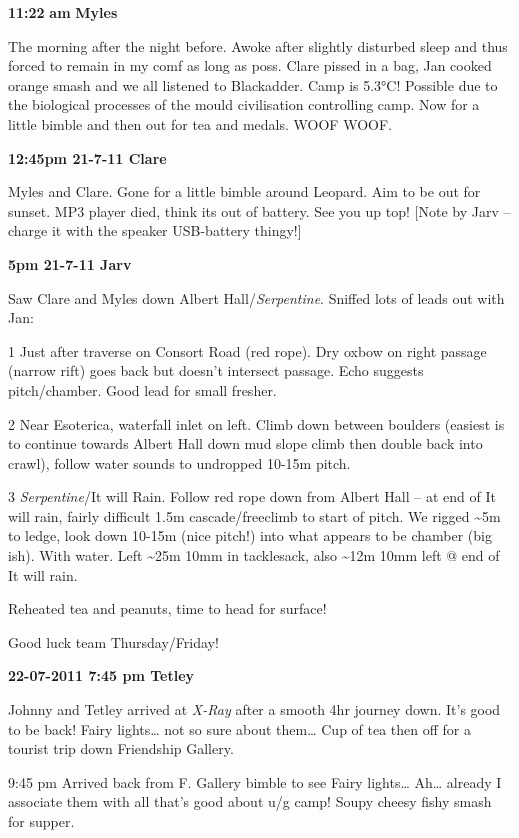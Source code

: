 \textbf{11:22} \textbf{am} \textbf{Myles}

The morning after the night before. Awoke after slightly disturbed sleep
and thus forced to remain in my comf as long as poss. Clare pissed in a
bag, Jan cooked orange smash and we all listened to Blackadder. Camp is
5.3°C! Possible due to the biological processes of the mould
civilisation controlling camp. Now for a little bimble and then out for
tea and medals. WOOF WOOF.

\textbf{12:45pm 21-7-11 Clare}

Myles and Clare. Gone for a little bimble around Leopard. Aim to be out
for sunset. MP3 player died, think its out of battery. See you up top!
{[}Note by Jarv -- charge it with the speaker USB-battery thingy!{]}

\textbf{5pm 21-7-11 Jarv}

Saw Clare and Myles down Albert Hall/\emph{Serpentine}. Sniffed lots of
leads out with Jan:

1 Just after traverse on Consort Road (red rope). Dry oxbow on right
passage (narrow rift) goes back but doesn't intersect passage. Echo
suggests pitch/chamber. Good lead for small fresher.

2 Near Esoterica, waterfall inlet on left. Climb down between boulders
(easiest is to continue towards Albert Hall down mud slope climb then
double back into crawl), follow water sounds to undropped 10-15m pitch.

3 \emph{Serpentine}/It will Rain. Follow red rope down from Albert Hall
-- at end of It will rain, fairly difficult 1.5m cascade/freeclimb to
start of pitch. We rigged \textasciitilde{}5m to ledge, look down 10-15m
(nice pitch!) into what appears to be chamber (big ish). With water.
Left \textasciitilde{}25m 10mm in tacklesack, also \textasciitilde{}12m
10mm left @ end of It will rain.

Reheated tea and peanuts, time to head for surface!

Good luck team Thursday/Friday!

\textbf{22-07-2011 7:45 pm Tetley}

Johnny and Tetley arrived at \emph{X-Ray} after a smooth 4hr journey
down. It's good to be back! Fairy lights\ldots{} not so sure about
them\ldots{} Cup of tea then off for a tourist trip down Friendship
Gallery.

9:45 pm Arrived back from F. Gallery bimble to see Fairy lights\ldots{}
Ah\ldots{} already I associate them with all that's good about u/g camp!
Soupy cheesy fishy smash for supper.

